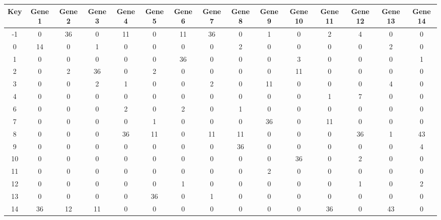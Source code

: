 \begin{tabular}{|c|c|c|c|c|c|c|c|c|c|c|c|c|c|c|}
\hline
Key & Gene 1 & Gene 2 & Gene 3 & Gene 4 & Gene 5 & Gene 6 & Gene 7 & Gene 8 & Gene 9 & Gene 10 & Gene 11 & Gene 12 & Gene 13 & Gene 14 \\
\hline
-1 & 0 & 36 & 0 & 11 & 0 & 11 & 36 & 0 & 1 & 0 & 2 & 4 & 0 & 0 \\
0 & 14 & 0 & 1 & 0 & 0 & 0 & 0 & 2 & 0 & 0 & 0 & 0 & 2 & 0 \\
1 & 0 & 0 & 0 & 0 & 0 & 36 & 0 & 0 & 0 & 3 & 0 & 0 & 0 & 1 \\
2 & 0 & 2 & 36 & 0 & 2 & 0 & 0 & 0 & 0 & 11 & 0 & 0 & 0 & 0 \\
3 & 0 & 0 & 2 & 1 & 0 & 0 & 2 & 0 & 11 & 0 & 0 & 0 & 4 & 0 \\
4 & 0 & 0 & 0 & 0 & 0 & 0 & 0 & 0 & 0 & 0 & 1 & 7 & 0 & 0 \\
6 & 0 & 0 & 0 & 2 & 0 & 2 & 0 & 1 & 0 & 0 & 0 & 0 & 0 & 0 \\
7 & 0 & 0 & 0 & 0 & 1 & 0 & 0 & 0 & 36 & 0 & 11 & 0 & 0 & 0 \\
8 & 0 & 0 & 0 & 36 & 11 & 0 & 11 & 11 & 0 & 0 & 0 & 36 & 1 & 43 \\
9 & 0 & 0 & 0 & 0 & 0 & 0 & 0 & 36 & 0 & 0 & 0 & 0 & 0 & 4 \\
10 & 0 & 0 & 0 & 0 & 0 & 0 & 0 & 0 & 0 & 36 & 0 & 2 & 0 & 0 \\
11 & 0 & 0 & 0 & 0 & 0 & 0 & 0 & 0 & 2 & 0 & 0 & 0 & 0 & 0 \\
12 & 0 & 0 & 0 & 0 & 0 & 1 & 0 & 0 & 0 & 0 & 0 & 1 & 0 & 2 \\
13 & 0 & 0 & 0 & 0 & 36 & 0 & 1 & 0 & 0 & 0 & 0 & 0 & 0 & 0 \\
14 & 36 & 12 & 11 & 0 & 0 & 0 & 0 & 0 & 0 & 0 & 36 & 0 & 43 & 0 \\
\hline
\end{tabular}
